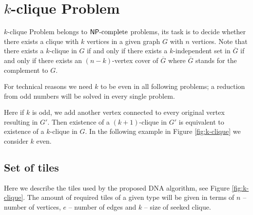 \section{$k$-clique Problem}

$k$-clique Problem belongs to $\mathsf{NP}\textnormal{-complete}$ problems, its task is to decide whether there exists a clique with $k$ vertices in a given graph $G$ with $n$ vertices. Note that there exists a $k$-clique in $G$ if and only if there exists a $k$-independent set in $\overline{G}$ if and only if there exists an $(n-k)$-vertex cover of $\overline{G}$ where $\overline{G}$ stands for the complement to $G$.

For technical reasons we need $k$ to be even in all following problems; a reduction from odd numbers will be solved in every single problem.

Here if $k$ is odd, we add another vertex connected to every original vertex resulting in $G'$. Then existence of a $(k+1)$-clique in $G'$ is equivalent to existence of a $k$-clique in $G$. In the following example in Figure \ref{fig:k-clique} we consider $k$ even.

\subsection*{Set of tiles}

Here we describe the tiles used by the proposed DNA algorithm, see Figure \ref{fig:k-clique}. The amount of required tiles of a given type will be given in terms of $n$ -- number of vertices, $e$ -- number of edges and $k$ -- size of seeked clique.

